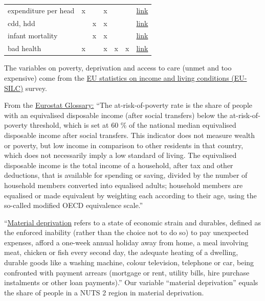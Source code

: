 \documentclass[a4paper,12pt]{article}
\begin{document}
\begin{table}[htbp]
\begin{tabular}{lllllll}
expenditure per head & x &  & x &  &  & \href{https://ec.europa.eu/eurostat/databrowser/view/hlth\_sha11\_hc/default/table?lang=en}{link}\\[0pt]
cdd, hdd &  & x & x &  &  & \href{https://ec.europa.eu/eurostat/databrowser/view/NRG\_CHDDR2\_A/default/table?lang=en}{link}\\[0pt]
infant mortality &  & x & x &  &  & \href{https://ec.europa.eu/eurostat/databrowser/view/DEMO\_R\_MINFIND/default/table?lang=en\&category=demo.demomreg}{link}\\[0pt]
bad health & x &  & x & x & x & \href{https://ec.europa.eu/eurostat/databrowser/view/hlth\_silc\_02/default/table?lang=en}{link}\\[0pt]
\end{tabular}
\end{table}



The variables on poverty, deprivation and access to care (unmet and too expensive) come from the \href{https://ec.europa.eu/eurostat/statistics-explained/index.php?title=EU\_statistics\_on\_income\_and\_living\_conditions\_(EU-SILC)\_methodology}{EU statistics on income and living conditions (EU-SILC)} survey.

From the \href{https://ec.europa.eu/eurostat/statistics-explained/index.php?title=Glossary:At-risk-of-poverty\_rate}{Eurostat Glossary:} ``The at-risk-of-poverty rate is the share of people with an equivalised disposable income (after social transfers) below the at-risk-of-poverty threshold, which is set at 60 \% of the national median equivalised disposable income after social transfers. This indicator does not measure wealth or poverty, but low income in comparison to other residents in that country, which does not necessarily imply a low standard of living. The equivalised disposable income is the total income of a household, after tax and other deductions, that is available for spending or saving, divided by the number of household members converted into equalised adults; household members are equalised or made equivalent by weighting each according to their age, using the so-called modified OECD equivalence scale.''

``\href{https://ec.europa.eu/eurostat/statistics-explained/index.php?title=Glossary:Material\_deprivation}{Material deprivation} refers to a state of economic strain and durables, defined as the enforced inability (rather than the choice not to do so) to pay unexpected expenses, afford a one-week annual holiday away from home, a meal involving meat, chicken or fish every second day, the adequate heating of a dwelling, durable goods like a washing machine, colour television, telephone or car, being confronted with payment arrears (mortgage or rent, utility bills, hire purchase instalments or other loan payments).'' Our variable ``material deprivation'' equals the share of people in a NUTS 2 region in material deprivation.
\end{document}
